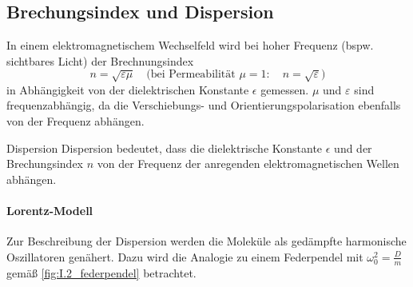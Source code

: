 \subsection{Brechungsindex und Dispersion}
    In einem elektromagnetischem Wechselfeld wird bei hoher Frequenz (bspw. sichtbares Licht) der Brechnungsindex
    $$
    n = \sqrt{ \varepsilon \mu}\quad\text{(bei Permeabilität } \mu = 1: \quad n = \sqrt{ \varepsilon }) 
    $$
    in Abhängigkeit von der dielektrischen Konstante $\epsilon$ gemessen.
    $\mu$ und $\varepsilon$ sind frequenzabhängig, da die Verschiebungs- und Orientierungspolarisation ebenfalls von der Frequenz abhängen.

    \begin{definition}{Dispersion}
        Dispersion bedeutet, dass die dielektrische Konstante $\epsilon$ und der Brechungsindex $n$ von der Frequenz der anregenden elektromagnetischen Wellen abhängen.
    \end{definition}
    
    \begin{minipage}{0.45\linewidth}
        \paragraph{Lorentz-Modell} Zur Beschreibung der Dispersion werden die Moleküle als gedämpfte harmonische Oszillatoren genähert. Dazu wird die Analogie zu einem Federpendel mit $\omega_0^2=\frac Dm$  gemäß \autoref{fig:I.2_federpendel} betrachtet.\\
    \end{minipage}\hspace{0.5cm}
    \begin{minipage}{0.5\linewidth}
        \centering
        \label{fig:I.2_federpendel}
    \end{minipage}

